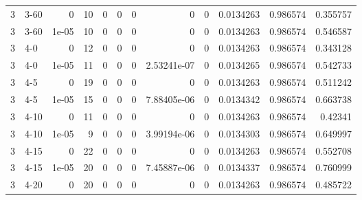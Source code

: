 \begin{tabular}{rlrrrrrrrrrr}
     3 & 3-60   &      0     &          10 &                 0 &                 0 &     0           &     0           &      0           &        0.0134263 &               0.986574 &           0.355757 \\
     3 & 3-60   &      1e-05 &          10 &                 0 &                 0 &     0           &     0           &      0           &        0.0134263 &               0.986574 &           0.546587 \\
     3 & 4-0    &      0     &          12 &                 0 &                 0 &     0           &     0           &      0           &        0.0134263 &               0.986574 &           0.343128 \\
     3 & 4-0    &      1e-05 &          11 &                 0 &                 0 &     0           &     2.53241e-07 &      0           &        0.0134265 &               0.986574 &           0.542733 \\
     3 & 4-5    &      0     &          19 &                 0 &                 0 &     0           &     0           &      0           &        0.0134263 &               0.986574 &           0.511242 \\
     3 & 4-5    &      1e-05 &          15 &                 0 &                 0 &     0           &     7.88405e-06 &      0           &        0.0134342 &               0.986574 &           0.663738 \\
     3 & 4-10   &      0     &          11 &                 0 &                 0 &     0           &     0           &      0           &        0.0134263 &               0.986574 &           0.42341  \\
     3 & 4-10   &      1e-05 &           9 &                 0 &                 0 &     0           &     3.99194e-06 &      0           &        0.0134303 &               0.986574 &           0.649997 \\
     3 & 4-15   &      0     &          22 &                 0 &                 0 &     0           &     0           &      0           &        0.0134263 &               0.986574 &           0.552708 \\
     3 & 4-15   &      1e-05 &          20 &                 0 &                 0 &     0           &     7.45887e-06 &      0           &        0.0134337 &               0.986574 &           0.760999 \\
     3 & 4-20   &      0     &          20 &                 0 &                 0 &     0           &     0           &      0           &        0.0134263 &               0.986574 &           0.485722 \\

\end{tabular}
